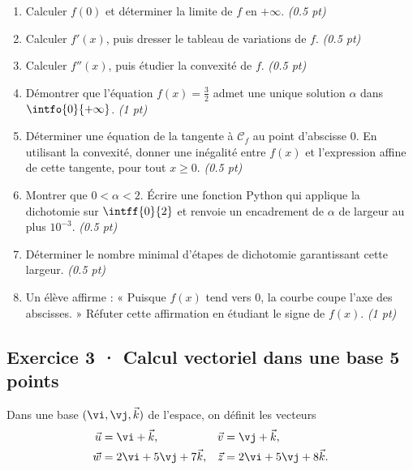 \begin{enumerate}

\item Calculer $f(0)$ et déterminer la limite de $f$ en $+\infty$. \hfill\textit{(\num{0,5} pt)}

\item Calculer $f' (x)$, puis dresser le tableau de variations de $f$. \hfill\textit{(\num{0,5} pt)}

\item Calculer $f'' (x)$, puis étudier la convexité de $f$. \hfill\textit{(\num{0,5} pt)}

\item Démontrer que l'équation $f(x)=\frac{3}{2}$ admet une unique solution $\alpha$ dans $\intfo{0}{+\infty}$. \hfill\textit{(1 pt)}

\item Déterminer une équation de la tangente à $\mathcal C_f$ au point d'abscisse $0$. En utilisant la convexité, donner une inégalité entre $f(x)$ et l'expression affine de cette tangente, pour tout $x\ge0$. \hfill\textit{(\num{0,5} pt)}

\item Montrer que $0<\alpha<2$. Écrire une fonction Python qui applique la dichotomie sur $\intff{0}{2}$ et renvoie un encadrement de $\alpha$ de largeur au plus $10^{-3}$. \hfill\textit{(\num{0,5} pt)}

\item Déterminer le nombre minimal d'étapes de dichotomie garantissant cette largeur. \hfill\textit{(\num{0,5} pt)}

\item Un élève affirme : « Puisque $f(x)$ tend vers $0$, la courbe coupe l'axe des abscisses. » Réfuter cette affirmation en étudiant le signe de $f(x)$. \hfill\textit{(1 pt)}

\end{enumerate}

\mxnewpage{}

\subsection*{Exercice 3 · Calcul vectoriel dans une base \hfill 5 points}Dans une base $(\vi,\vj,\vec k)$ de l'espace, on définit les vecteurs
\[\begin{aligned}\vec u&=\vi+\vec k,&\vec v&=\vj+\vec k,\\
\vec w&=2\vi+5\vj+7\vec k,&\vec z&=2\vi+5\vj+8\vec k.\end{aligned}\]

